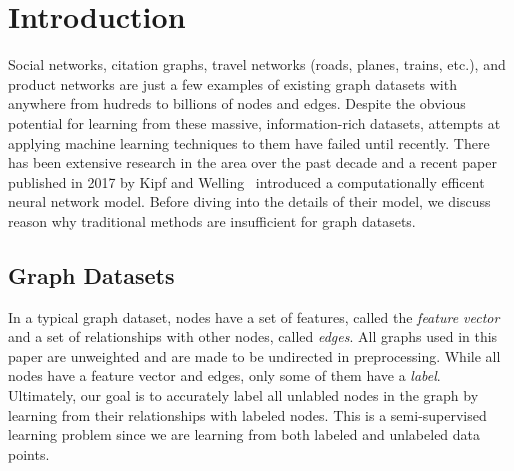 \section{Introduction} \label{sec:introduction}

Social networks, citation graphs, travel networks (roads, planes, trains, etc.), and product networks are just a few examples of existing graph datasets with anywhere from hudreds to billions of nodes and edges. Despite the obvious potential for learning from these massive, information-rich datasets, attempts at applying machine learning techniques to them have failed until recently. There has been extensive research in the area over the past decade and a recent paper published in 2017 by Kipf and Welling~\cite{Kipf2016} introduced a computationally efficent neural network model. Before diving into the details of their model, we discuss reason why traditional methods are insufficient for graph datasets. 

\subsection{Graph Datasets} \label{sec:network-datasets}
In a typical graph dataset, nodes have a set of features, called the \textit{feature vector} and a set of relationships with other nodes, called \textit{edges}. All graphs used in this paper are unweighted and are made to be undirected in preprocessing. While all nodes have a feature vector and edges, only some of them have a \textit{label}. Ultimately, our goal is to accurately label all unlabled nodes in the graph by learning from their relationships with labeled nodes. This is a semi-supervised learning problem since we are learning from both labeled and unlabeled data points. 


